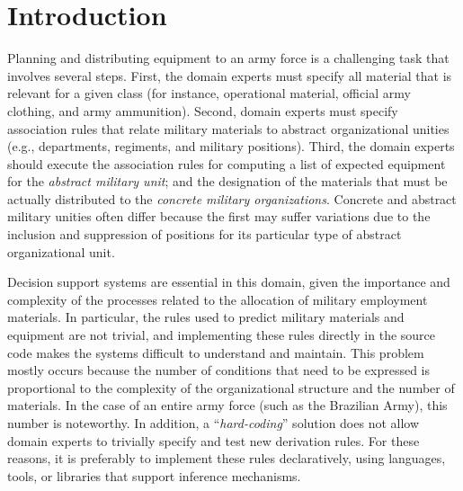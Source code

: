 \documentclass[AMA,STIX1COL]{WileyNJD-v2}
\begin{document}



\maketitle



\section{Introduction}\label{sec:Introduction}

Planning and distributing equipment to an army force is a
  challenging task that involves several steps. First, the
  domain experts must specify all material that is relevant
  for a given class (for instance, operational material, official army clothing,
  and army ammunition). Second, domain experts must specify association 
rules that relate military materials to abstract 
organizational unities (e.g., departments, regiments,
and military positions). Third, the domain experts should 
execute the association rules for computing a list of expected
equipment for the \emph{abstract military unit}; and the
designation of the materials that must be
actually distributed to the \emph{concrete military organizations}. Concrete and
abstract military unities often differ because the first may suffer
variations due to the inclusion and suppression of positions
for its particular type of abstract organizational unit.

Decision support systems are essential in this domain, given the importance and complexity of the processes related to the allocation of military employment materials. In particular, the rules used to predict military materials and equipment are not trivial, and implementing these rules directly in the source code makes the systems difficult to understand and maintain. This problem mostly occurs because the number of conditions that need to be expressed is proportional to the complexity of the organizational structure and the number of materials. In the case of an entire army force (such as the Brazilian Army), this number is noteworthy. In addition, a ``\emph{hard-coding}'' solution does not allow domain experts to trivially specify and test new derivation rules. For these reasons, it is preferably to implement these rules declaratively, using languages, tools, or libraries that
support inference mechanisms.
\end{document}

